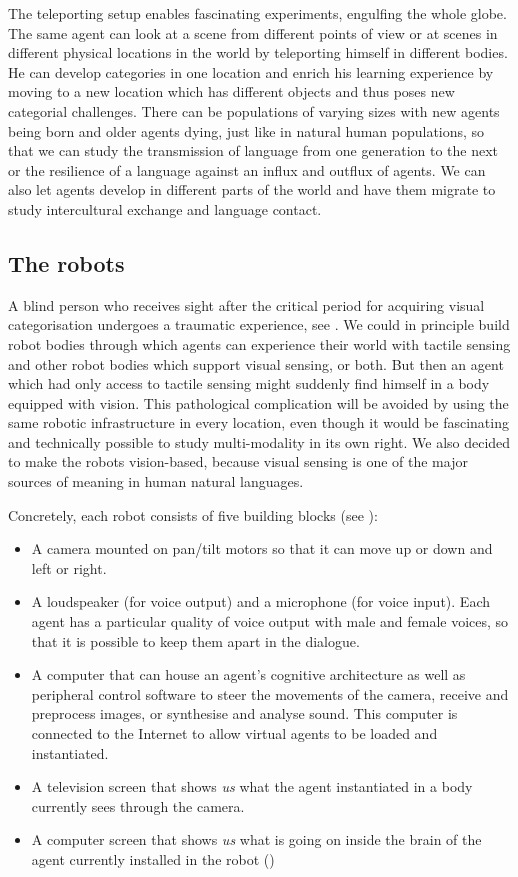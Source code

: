 The teleporting setup enables fascinating 
experiments, engulfing the 
whole globe. The same agent can look at a scene from
different points of view or at scenes in different
physical locations in the world by teleporting himself in different 
bodies. He can develop categories in one location
and enrich his learning experience by moving to a new 
location which has different objects and thus poses new 
categorial challenges.
There can be populations of varying sizes with new 
agents being born and older agents dying, just like in 
natural human populations, so that we can study the 
transmission of language from one generation to the next
or the resilience of a language against an influx and 
outflux of agents. We can also let agents develop in
different parts of the world and have them migrate to
study intercultural exchange and language contact. 

\subsection{The robots}

A blind person who receives sight after the critical 
period for acquiring visual categorisation undergoes a 
traumatic experience, see \cite{Zeki:1993}. 
We could in principle build robot bodies
through which agents can experience their world with tactile
sensing and other robot bodies which support visual sensing, or both. 
But then an agent which had only access to tactile
sensing might suddenly find himself in a body equipped with 
vision. This pathological complication will 
be avoided by using the same robotic infrastructure
in every location, even though it would be fascinating and 
technically possible to study multi-modality in its 
own right. 
We also decided to make the robots vision-based, because visual 
sensing is one of the major sources of meaning in
human natural languages. 

Concretely, each robot consists of five building blocks (see ):
\enlargethispage{1\baselineskip}
\begin{itemize}
\item A camera mounted on pan/tilt motors so that it can move 
up or down and left or right. 
\item A loudspeaker (for voice output) and a microphone (for 
voice input). Each agent has a particular quality of voice
output with male and female voices, so that it is possible 
to keep them apart in the dialogue. 
\item A computer that can house an agent's 
cognitive architecture as well as peripheral 
control software to steer the movements of the camera, 
receive and preprocess images, or synthesise and analyse 
sound. This computer is connected 
to the Internet to allow virtual agents to be loaded and instantiated. 
\item A television screen that shows {\itshape us} what the agent
instantiated in a body currently sees through the camera. 
\item A computer screen that shows {\itshape us} what is going on inside
the brain of the agent currently installed in the robot ()
\end{itemize}


